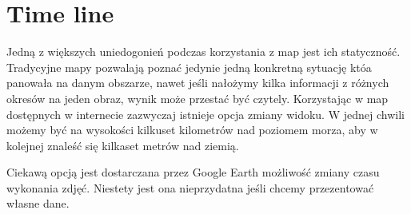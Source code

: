 \section{Time line}
\label{sec:Time line}

Jedną z większych uniedogonień podczas korzystania z map jest ich statyczność. Tradycyjne mapy pozwalają poznać jedynie jedną konkretną sytuację któa panowała na danym obszarze, nawet jeśli nałożymy kilka informacji z różnych okresów na jeden obraz, wynik może przestać być czytely. Korzystając w map dostępnych w internecie zazwyczaj istnieje opcja zmiany widoku. W jednej chwili możemy być na wysokości kilkuset kilometrów nad poziomem morza, aby w kolejnej znaleść się kilkaset metrów nad ziemią.

Ciekawą opcją jest dostarczana przez Google Earth możliwość zmiany czasu wykonania zdjęć. Niestety jest ona nieprzydatna jeśli chcemy przezentować własne dane.




